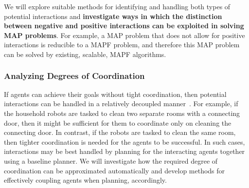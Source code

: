 \documentclass[11pt]{article}
\begin{document}
We will explore suitable methods for identifying and handling both types of potential interactions and {\bf investigate ways in which the distinction between negative and positive interactions can be exploited in solving MAP problems}. For example, a MAP problem that does not allow for positive interactions is reducible to a MAPF problem, and therefore this MAP problem can be solved by existing, scalable, MAPF algorithms. 


 


\subsubsection{Analyzing Degrees of Coordination} %
If agents can achieve their goals without tight coordination, then potential interactions can be handled in a relatively decoupled manner~\cite{kamar2013modeling,nissim2014distributed,maliah2014privacyPreserving,sharon2015conflict-based}. For example, if the household robots are tasked to clean two separate rooms with a connecting door, then it might be sufficient for them to coordinate only on cleaning the connecting door.  In contrast, if the robots are tasked to clean the same room, then tighter coordination is needed for the agents to be successful. In such cases, interactions may be best handled by planning for the interacting agents together using a baseline planner. We will investigate how the required degree of coordination can be approximated automatically and develop methods for effectively coupling agents when planning, accordingly. %

\end{document}
